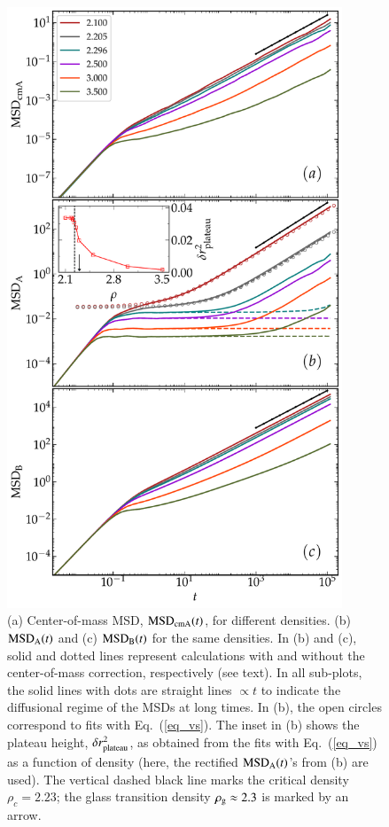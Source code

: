 %
\begin{figure}
\centering
\includegraphics[width=10cm]{figs/fig6p5.pdf}
\caption[{\em Center-of-mass MSD and MSD of bigger and smaller species}]{(a) Center-of-mass MSD, {${\rm MSD}_{\rm cmA}(t)$, for different densities. (b) ${\rm MSD}_{\rm A}(t)$ and (c) ${\rm MSD}_{\rm B}(t)$} for the same densities. In (b) and (c), solid and dotted lines represent calculations with and without the center-of-mass correction, respectively (see text).  In all sub-plots, the solid lines with dots are straight lines $\propto t$ to indicate the diffusional regime of the MSDs at long times. {In (b), the open circles correspond to fits with Eq.~(\ref{eq_vs}). The inset in (b) shows the plateau height, $\delta r^2_{\rm plateau}$, as obtained from the fits with Eq.~(\ref{eq_vs}) as a function of density (here, the rectified ${\rm MSD}_{\rm A}(t)$'s from (b) are used). The vertical dashed black line marks the critical density $\rho_c = 2.23$; the glass transition density $\rho_{\rm g}\approx 2.3$ is marked by an arrow.}
\label{fig6p5}}
\end{figure}
%

